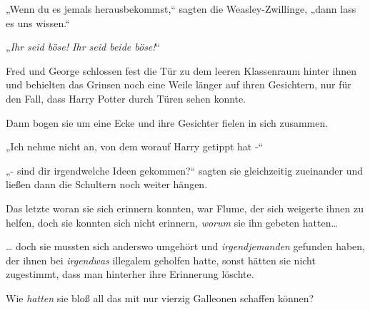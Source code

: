 „Wenn du es jemals herausbekommst,“ sagten die Weasley-Zwillinge, „dann lass es uns wissen.“

„\emph{Ihr seid böse! Ihr seid beide böse!}“

Fred und George schlossen fest die Tür zu dem leeren Klassenraum hinter ihnen und behielten das Grinsen noch eine Weile länger auf ihren Gesichtern, nur für den Fall, dass Harry Potter durch Türen sehen konnte.

Dann bogen sie um eine Ecke und ihre Gesichter fielen in sich zusammen.

„Ich nehme nicht an, von dem worauf Harry getippt hat -“

„- sind dir irgendwelche Ideen gekommen?“ sagten sie gleichzeitig zueinander und ließen dann die Schultern noch weiter hängen.

Das letzte woran sie sich erinnern konnten, war Flume, der sich weigerte ihnen zu helfen, doch sie konnten sich nicht erinnern, \emph{worum} sie ihn gebeten hatten…

… doch sie mussten sich anderswo umgehört und \emph{irgendjemanden} gefunden haben, der ihnen bei \emph{irgendwas} illegalem geholfen hatte, sonst hätten sie nicht zugestimmt, dass man hinterher ihre Erinnerung löschte.

Wie \emph{hatten} sie bloß all das mit nur vierzig Galleonen schaffen können?

